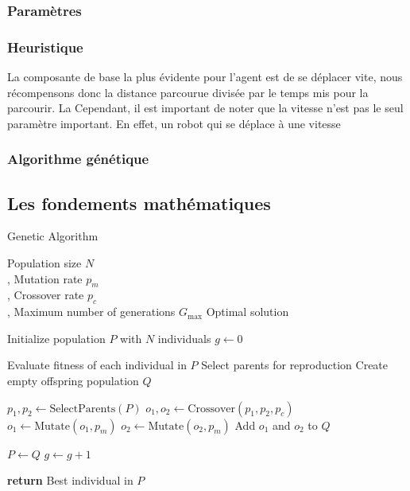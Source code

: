 \documentclass[journal, a4paper]{IEEEtran}
\begin{document}
	\subsubsection{Paramètres}

	\subsubsection{Heuristique}

	La composante de base la plus évidente pour l'agent est de se
	déplacer vite, nous récompensons donc la distance parcourue
	divisée par le temps mis pour la parcourir. La
	Cependant, il est
	important de noter que la vitesse n'est pas le seul paramètre
	important. En effet, un robot qui se déplace à une vitesse


	\subsubsection{Algorithme génétique}
	\subsection{Les fondements mathématiques}\label{subsec:les-fondements-mathematiques}

	\begin{algorithm}
		  \caption{Genetic Algorithm}\label{alg:ga}
		  \begin{algorithmic}
			\Require Population size $N$
			\\ , Mutation rate $p_m$
			\\ , Crossover rate $p_c$
			\\ , Maximum number of generations $G_{\max}$
			\Ensure Optimal solution

			\State Initialize population $P$ with $N$ individuals
			\State $g \gets 0$

			  \State Evaluate fitness of each individual in $P$
			  \State Select parents for reproduction
			  \State Create empty offspring population $Q$

				\State $p_1, p_2 \gets \text{SelectParents}(P)$
				\State $o_1, o_2 \gets \text{Crossover}(p_1, p_2, p_c)$
				\State $o_1 \gets \text{Mutate}(o_1, p_m)$
				\State $o_2 \gets \text{Mutate}(o_2, p_m)$
				\State Add $o_1$ and $o_2$ to $Q$
			  \EndWhile

			  \State $P \gets Q$
			  \State $g \gets g + 1$
			\EndWhile

			\State \textbf{return} Best individual in $P$
		  \end{algorithmic}
	\end{algorithm}
\end{document}
